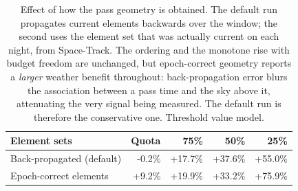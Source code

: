 \begin{table}[t]
\caption{Effect of how the pass geometry is obtained. The default run propagates current elements backwards over the window; the second uses the element set that was actually current on each night, from Space-Track. The ordering and the monotone rise with budget freedom are unchanged, but epoch-correct geometry reports a \emph{larger} weather benefit throughout: back-propagation error blurs the association between a pass time and the sky above it, attenuating the very signal being measured. The default run is therefore the conservative one. Threshold value model.}
\label{tab:histtle}
\centering
\setlength{\tabcolsep}{4pt}
\begin{tabular}{lrrrr}
\toprule
Element sets & Quota & 75\% & 50\% & 25\% \\
\midrule
Back-propagated (default) & -0.2\% & +17.7\% & +37.6\% & +55.0\% \\
Epoch-correct elements & +9.2\% & +19.9\% & +33.2\% & +75.9\% \\
\bottomrule
\end{tabular}
\end{table}
